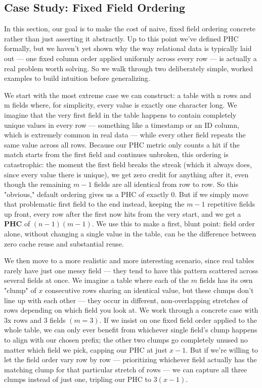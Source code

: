\documentclass[manuscript,review]{acmart}
\begin{document}
\subsection{Case Study: Fixed Field Ordering}
\label{sec:case study}
In this section, our goal is to make the cost of naive, fixed field ordering concrete rather than just asserting it abstractly. Up to this point we've defined PHC formally, but we haven't yet shown why the way relational data is typically laid out — one fixed column order applied uniformly across every row — is actually a real problem worth solving. So we walk through two deliberately simple, worked examples to build intuition before generalizing.

We start with the most extreme case we can construct: a table with n rows and m fields where, for simplicity, every value is exactly one character long. We imagine that the very first field in the table happens to contain completely unique values in every row — something like a timestamp or an ID column, which is extremely common in real data — while every other field repeats the same value across all rows. Because our PHC metric only counts a hit if the match starts from the first field and continues unbroken, this ordering is catastrophic: the moment the first field breaks the streak (which it always does, since every value there is unique), we get zero credit for anything after it, even though the remaining $m-1$ fields are all identical from row to row. So this "obvious," default ordering gives us a PHC of exactly 0. But if we simply move that problematic first field to the end instead, keeping the $m-1$ repetitive fields up front, every row after the first now hits from the very start, and we get a \textbf{PHC} of $(n-1)(m-1)$. We use this to make a first, blunt point: field order alone, without changing a single value in the table, can be the difference between zero cache reuse and substantial reuse.

We then move to a more realistic and more interesting scenario, since real tables rarely have just one messy field — they tend to have this pattern scattered across several fields at once. We imagine a table where each of the $m$ fields has its own "clump" of $x$ consecutive rows sharing an identical value, but these clumps don't line up with each other — they occur in different, non-overlapping stretches of rows depending on which field you look at. We work through a concrete case with 3x rows and 3 fields $(m=3)$. If we insist on one fixed field order applied to the whole table, we can only ever benefit from whichever single field's clump happens to align with our chosen prefix; the other two clumps go completely unused no matter which field we pick, capping our PHC at just $x-1$. But if we're willing to let the field order vary row by row — prioritizing whichever field actually has the matching clump for that particular stretch of rows — we can capture all three clumps instead of just one, tripling our PHC to $3(x-1)$.
\end{document}
